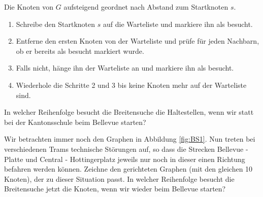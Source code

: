  Die Knoten von $G$ aufsteigend geordnet nach Abstand zum Startknoten $s$.

\begin{enumerate}
    \item Schreibe den Startknoten $s$ auf die Warteliste und markiere ihn als besucht.
    \item Entferne den ersten Knoten von der Warteliste und prüfe für jeden Nachbarn, ob er bereits als besucht markiert wurde.
    \item Falls nicht, hänge ihn der Warteliste an und markiere ihn als besucht.
    \item Wiederhole die Schritte 2 und 3 bis keine Knoten mehr auf der Warteliste sind.
\end{enumerate}

\begin{aufgabe} \label{newinitial}
In welcher Reihenfolge besucht die Breitensuche die Haltestellen, wenn wir statt bei der Kantonsschule beim Bellevue starten?
\end{aufgabe}

\begin{aufgabe} \label{directed}
Wir betrachten immer noch den Graphen in Abbildung \ref{fig:BS1}. Nun
treten bei verschiedenen Trams technische Störungen auf, so dass die Strecken Bellevue - Platte und Central - Hottingerplatz jeweils nur noch in dieser einen Richtung befahren werden können. Zeichne den gerichteten Graphen (mit den gleichen 10 Knoten), der zu dieser Situation passt. In welcher Reihenfolge besucht die Breitensuche jetzt die Knoten, wenn wir wieder beim Bellevue starten? 
\end{aufgabe}


